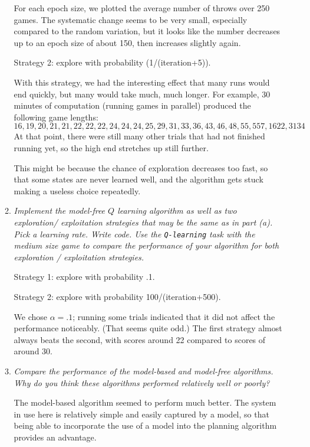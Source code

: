 \documentclass{article}
\begin{document}
\begin{enumerate}
\begin{enumerate}
    For each epoch size, we plotted the average number of throws over
    250 games. The systematic change seems to be very small,
    especially compared to the random variation, but it looks like the
    number decreases up to an epoch size of about 150, then increases
    slightly again.

    Strategy 2: explore with probability (1/(iteration+5)).

    With this strategy, we had the interesting effect that many runs
    would end quickly, but many would take much, much longer. For
    example, 30 minutes of computation (running games in parallel)
    produced the following game lengths:
    \[16, 19, 20, 21, 21, 22, 22, 22, 24, 24, 24, 25, 29, 31, 33, 36, 43, 46, 48, 55, 557, 1622, 3134\]
    At that point, there were still many other trials that had not
    finished running yet, so the high end stretches up still further.

    This might be because the chance of exploration decreases too
    fast, so that some states are never learned well, and the
    algorithm gets stuck making a useless choice repeatedly.

  \item \emph{Implement the model-free $Q$ learning algorithm as well
    as two exploration/ exploitation strategies that may be the same
    as in part (a). Pick a learning rate. Write code. Use the
    \texttt{Q-learning} task with the medium size game to compare the
    performance of your algorithm for both exploration / exploitation
    strategies.}

    Strategy 1: explore with probability .1.

    Strategy 2: explore with probability 100/(iteration+500).

    We chose $\alpha=.1$; running some trials indicated that it did
    not affect the performance noticeably. (That seems quite odd.) The
    first strategy almost always beats the second, with scores around
    22 compared to scores of around 30.

  \item \emph{Compare the performance of the model-based and
    model-free algorithms. Why do you think these algorithms performed
    relatively well or poorly?}

    The model-based algorithm seemed to perform much better. The
    system in use here is relatively simple and easily captured by a
    model, so that being able to incorporate the use of a model into
    the planning algorithm provides an advantage.

  \end{enumerate}

\end{enumerate}
\end{document}
